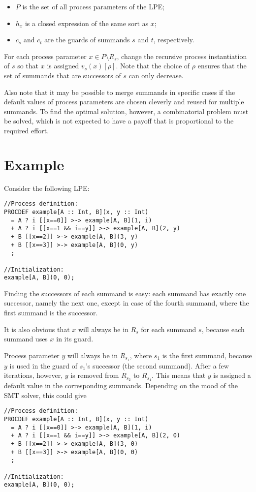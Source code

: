 \begin{enumerate}
\begin{itemize}
\item $P$ is the set of all process parameters of the LPE;
\item $h_x$ is a closed expression of the same sort as $x$;
\item $c_s$ and $c_t$ are the guards of summands $s$ and $t$, respectively.
\end{itemize}

For each process parameter $x \in P \setminus R_s$, change the recursive process instantiation of $s$ so that $x$ is assigned $v_s(x)[\rho]$.
Note that the choice of $\rho$ ensures that the set of summands that are successors of $s$ can only decrease.

Also note that it may be possible to merge summands in specific cases if the default values of process parameters are chosen cleverly and reused for multiple summands.
To find the optimal solution, however, a combinatorial problem must be solved, which is not expected to have a payoff that is proportional to the required effort.

\end{enumerate}

\section{Example}

Consider the following LPE:

\begin{lstlisting}
//Process definition:
PROCDEF example[A :: Int, B](x, y :: Int)
  = A ? i [[x==0]] >-> example[A, B](1, i)
  + A ? i [[x==1 && i==y]] >-> example[A, B](2, y)
  + B [[x==2]] >-> example[A, B](3, y)
  + B [[x==3]] >-> example[A, B](0, y)
  ;

//Initialization:
example[A, B](0, 0);
\end{lstlisting}

Finding the successors of each summand is easy: each summand has exactly one successor, namely the next one, except in case of the fourth summand, where the first summand is the successor.

It is also obvious that $x$ will always be in $R_s$ for each summand $s$, because each summand uses $x$ in its guard.

Process parameter $y$ will always be in $R_{s_1}$, where $s_1$ is the first summand, because $y$ is used in the guard of $s_1$'s successor (the second summand).
After a few iterations, however, $y$ is removed from $R_{s_2}$ to $R_{s_4}$.
This means that $y$ is assigned a default value in the corresponding summands.
Depending on the mood of the SMT solver, this could give

\begin{lstlisting}
//Process definition:
PROCDEF example[A :: Int, B](x, y :: Int)
  = A ? i [[x==0]] >-> example[A, B](1, i)
  + A ? i [[x==1 && i==y]] >-> example[A, B](2, 0)
  + B [[x==2]] >-> example[A, B](3, 0)
  + B [[x==3]] >-> example[A, B](0, 0)
  ;

//Initialization:
example[A, B](0, 0);
\end{lstlisting}




